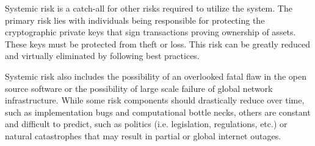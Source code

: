 Systemic risk is a catch-all for other risks required to utilize the system.
The primary risk lies with individuals being responsible for protecting the
cryptographic private keys that sign transactions proving ownership of assets.
These keys must be protected from theft or loss. This risk can be greatly
reduced and virtually eliminated by following best practices.


Systemic risk also includes the possibility of an overlooked fatal flaw in the
open source software or the possibility of large scale failure of global
network infrastructure. While some risk components should drastically reduce
over time, such as implementation bugs and computational bottle necks, others
are constant and difficult to predict, such as politics (i.e. legislation,
regulations, etc.) or natural catastrophes that may result in partial or global
internet outages.
